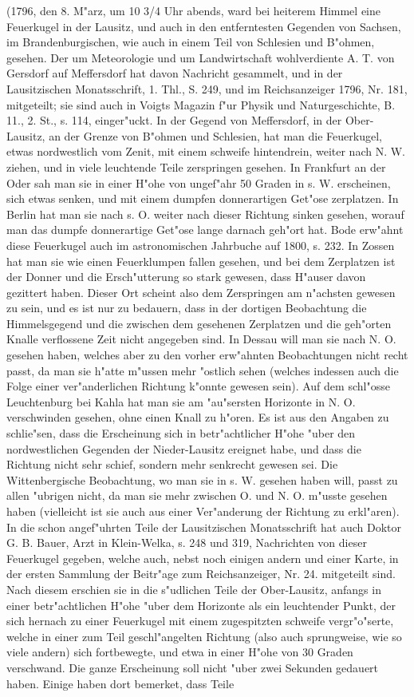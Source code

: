 \documentclass[a4paper, 11pt, oneside, polutonikogreek, german]{article}
\begin{document}
(1796, den 8. M"arz, um 10 3/4 Uhr abends, ward bei heiterem Himmel eine Feuerkugel in der Lausitz, und auch in den entferntesten Gegenden von Sachsen, im Brandenburgischen, wie auch in einem Teil von Schlesien und B"ohmen, gesehen. Der um Meteorologie und um Landwirtschaft wohlverdiente A. T. von Gersdorf auf Meffersdorf hat davon Nachricht gesammelt, und in der Lausitzischen Monatsschrift, 1. Thl., S. 249, und im Reichsanzeiger 1796, Nr. 181, mitgeteilt; sie sind auch in Voigts Magazin f"ur Physik und Naturgeschichte, B. 11., 2. St., s. 114, einger"uckt. In der Gegend von Meffersdorf, in der Ober-Lausitz, an der Grenze von B"ohmen und Schlesien, hat man die Feuerkugel, etwas nordwestlich vom Zenit, mit einem schweife hintendrein, weiter nach N. W. ziehen, und in viele leuchtende Teile zerspringen gesehen. In Frankfurt an der Oder sah man sie in einer H"ohe von ungef"ahr 50 Graden in s. W. erscheinen, sich etwas senken, und mit einem dumpfen donnerartigen Get"ose zerplatzen. In Berlin hat man sie nach s. O. weiter nach dieser Richtung sinken gesehen, worauf man das dumpfe donnerartige Get"ose lange darnach geh"ort hat. Bode erw"ahnt diese Feuerkugel auch im astronomischen Jahrbuche auf 1800, s. 232. In Zossen hat man sie wie einen Feuerklumpen fallen gesehen, und bei dem Zerplatzen ist der Donner und die Ersch"utterung so stark gewesen, dass H"auser davon gezittert haben. Dieser Ort scheint also dem Zerspringen am n"achsten gewesen zu sein, und es ist nur zu bedauern, dass in der dortigen Beobachtung die Himmelsgegend und die zwischen dem gesehenen Zerplatzen und die geh"orten Knalle verflossene Zeit nicht angegeben sind. In Dessau will man sie nach N. O. gesehen haben, welches aber zu den vorher erw"ahnten Beobachtungen nicht recht passt, da man sie h"atte m"ussen mehr "ostlich sehen (welches indessen auch die Folge einer ver"anderlichen Richtung k"onnte gewesen sein). Auf dem schl"osse Leuchtenburg bei Kahla hat man sie am "au"sersten Horizonte in N. O. verschwinden gesehen, ohne einen Knall zu h"oren. Es ist aus den Angaben zu schlie"sen, dass die Erscheinung sich in betr"achtlicher H"ohe "uber den nordwestlichen Gegenden der Nieder-Lausitz ereignet habe, und dass die Richtung nicht sehr schief, sondern mehr senkrecht gewesen sei. Die Wittenbergische Beobachtung, wo man sie in s. W. gesehen haben will, passt zu allen "ubrigen nicht, da man sie mehr zwischen O. und N. O. m"usste gesehen haben (vielleicht ist sie auch aus einer Ver"anderung der Richtung zu erkl"aren). In die schon angef"uhrten Teile der Lausitzischen Monatsschrift hat auch Doktor G. B. Bauer, Arzt in Klein-Welka, s. 248 und 319, Nachrichten von dieser Feuerkugel gegeben, welche auch, nebst noch einigen andern und einer Karte, in der ersten Sammlung der Beitr"age zum Reichsanzeiger, Nr. 24. mitgeteilt sind. Nach diesem erschien sie in die s"udlichen Teile der Ober-Lausitz, anfangs in einer betr"achtlichen H"ohe "uber dem Horizonte als ein leuchtender Punkt, der sich hernach zu einer Feuerkugel mit einem zugespitzten schweife vergr"o"serte, welche in einer zum Teil geschl"angelten Richtung (also auch sprungweise, wie so viele andern) sich fortbewegte, und etwa in einer H"ohe von 30 Graden verschwand. Die ganze Erscheinung soll nicht "uber zwei Sekunden gedauert haben. Einige haben dort bemerket, dass Teile 
\end{document}
